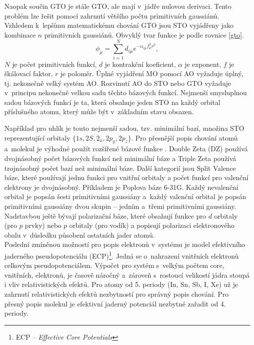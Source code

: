 \documentclass[
digital, %
table,   %
nolof,     %
nolot,     %
oneside,
]{fithesis3}
\begin{document}
Naopak součin GTO je stále GTO, ale mají v~jádře nulovou derivaci. Tento problém lze řešit pomocí zahrnutí většího počtu primitivních gaussiánů. Vzhledem k~lepšímu matematickému chování GTO jsou STO vyjádřeny jako kombinace $n$ primitivních gaussiánů. Obvyklý tvar funkce je podle rovnice \ref{gto}.
\begin{equation}
\phi_\mu = \sum_{i=1}^{N}d_{i\mu}e^{-\alpha_{i\mu}f^2_{\mu}r^2},
\label{gto}
\end{equation}
$N$ je počet primitivních funkcí, $d$ je kontrakční koeficient, $\alpha$ je exponent, $f$ je škálovací faktor, $r$ je poloměr. Úplné vyjádření MO pomocí AO vyžaduje úplný, tj. nekonečně velký systém AO. Rozvinutí AO do STO nebo GTO vyžaduje v~principu nekonečně velkou sadu těchto bázových funkcí. Nejmenší smysluplnou sadou bázových funkcí je ta, která obsahuje jeden STO na každý orbital příslušného atomu, který může být v~základním stavu obsazen.

Například pro uhlík je touto nejmenší sadou, tzv. minimální bazí, množina STO reprezentující orbitaly $\{1s, 2S, 2_x, 2p_y, 2p_z \}$. Pro přesnější popis chování atomů a~molekul je výhodné použít rozšířené bázové funkce \cite{lowe2011quantum}.
Double Zeta (DZ) používá dvojnásobný počet bázových funkcí než minimální báze a Triple Zeta používá trojnásobný počet bazí než minimální báze. Další kategorií jsou Split Valence báze, které používají jednu funkci pro vnitřní orbitaly a počet funkcí pro valenční elektrony je dvojnásobný. Příkladem je Poplova báze 6-31G. Každý nevalenční orbital je popsán šesti primitivními gaussiány a~každý valenční orbital je popsán primitivními gaussiány dvou skupin -- jedním a~třemi primitivními gaussiány. Nadstavbou ještě bývají polarizační báze, které obsahují funkce pro $d$ orbitaly (pro $p$ prvky) nebo $p$ orbitaly (pro vodík) a popisují polarizaci elektronového obalu v~důsledku působení ostatních jader atomů. \\

Poslední zmíněnou možností pro popis elektronů v~systému je model efektivního jaderného pseudopotenciálu (ECP)\footnote{ECP -- \textit{Effective Core Potentials}}. Jedná se o~nahrazení vnitřních elektronů celkovým pseudopotenciálem. Výpočet pro systém s~velkým počtem core, vnitřních, elektronů, je časově náročný a~zároveň s~rostoucí velikostí jádra stoupá i vliv relativistických efektů. Pro atomy od 5. periody (In, Sn, Sb, I, Xe) už je zahrnutí relativistických efektů nezbytností pro správný popis chování. Pro přesný popis molekul je efektivní jaderný potenciál nezbytné zařadit od 4. periody.
\end{document}
